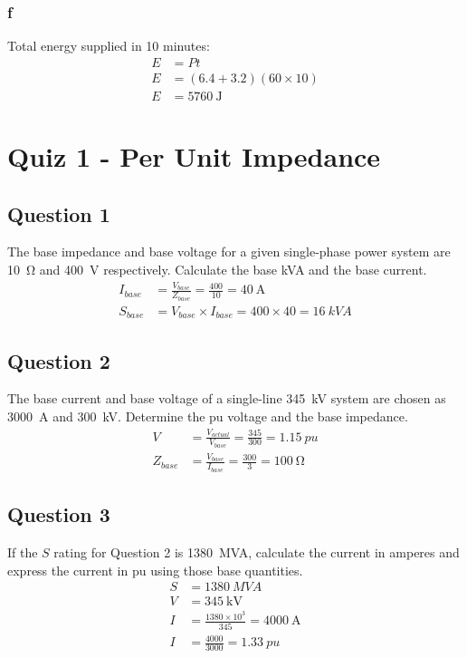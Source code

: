\subsection{f}
Total energy supplied in 10 minutes:
\begin{align}
    E & = Pt                                           \\
    E & = \left(6.4+3.2\right)\left(60\times 10\right) \\
    E & = \SI{5760}{\joule}
\end{align}
\chapter{Quiz 1 - Per Unit Impedance}
\section{Question 1}
The base impedance and base voltage for a given single-phase power system are \SI{10}{\ohm} and \SI{400}{\volt} respectively. Calculate the base kVA and the base current.
\begin{align}
    I_{base} & = \frac{V_{base}}{Z_{base}} = \frac{400}{10} = \SI{40}{\ampere} \\
    S_{base} & = V_{base}\times I_{base} = 400\times 40 = \SI{16}{kVA}
\end{align}
\section{Question 2}
The base current and base voltage of a single-line \SI{345}{\kilo\volt} system are chosen as \SI{3000}{\ampere} and \SI{300}{\kilo\volt}. Determine the pu voltage and the base impedance.
\begin{align}
    V        & = \frac{V_{actual}}{V_{base}} = \frac{345}{300} = \SI{1.15}{pu} \\
    Z_{base} & = \frac{V_{base}}{I_{base}} = \frac{300}{3} = \SI{100}{\ohm}
\end{align}
\section{Question 3}
If the $S$ rating for Question 2 is \SI{1380}{MVA}, calculate the current in amperes and express the current in pu using those base quantities.
\begin{align}
    S & = \SI{1380}{MVA}                                   \\
    V & = \SI{345}{\kilo\volt}                             \\
    I & = \frac{1380\times 10^3}{345} = \SI{4000}{\ampere} \\
    I & = \frac{4000}{3000} = \SI{1.33}{pu}
\end{align}
